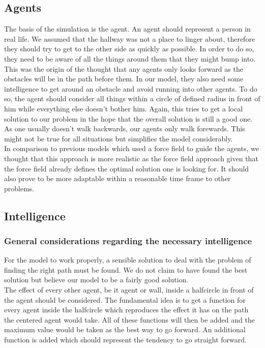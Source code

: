 \subsection{Agents}
The basis of the simulation is the agent. An agent should represent a person in real life. We assumed that the hallway was not a place to linger about, therefore they should try to get to the other side as quickly as possible. In order to do so, they need to be aware of all the things around them that they might bump into. This was the origin of the thought that any agents only looks forward as the obstacles will be in the path before them. In our model, they also need some intelligence to get around an obstacle and avoid running into other agents. To do so, the agent should consider all things within a circle of defined radius in front of him while everything else doesn't bother him. Again, this tries to get a local solution to our problem in the hope that the overall solution is still a good one. As one usually doesn't walk backwards, our agents only walk forewards. This might not be true for all situations but simplifies the model considerably.\\

\noi In comparison to previous models which used a force field to guide the agents, we thought that this approach is more realistic as the force field approach given that the force field already defines the optimal solution one is looking for. It should also prove to be more adaptable within a reasonable time frame to other problems.

\subsection{Intelligence}
\subsubsection{General considerations regarding the necessary intelligence}
For the model to work properly, a sensible solution to deal with the problem of finding the right path must be found. We do not claim to have found the best solution but believe our model to be a fairly good solution.\\
The effect of every other agent, be it agent or wall, inside a halfcircle in front of the agent should be considered. The fundamental idea is to get a function for every agent inside the halfcircle which reproduces the effect it has on the path the centered agent would take. All of these functions will then be added and the maximum value would be taken as the best way to go forward. An additional function is added which should represent the tendency to go straight forward.\\

